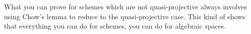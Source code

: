 %

 What you can prove for schemes which are not quasi-projective always involves using
 Chow's lemma to reduce to the quasi-projective case. This kind of shows that everything
 you can do for schemes, you can do for algebraic spaces.
